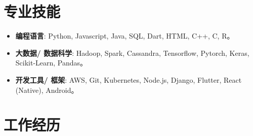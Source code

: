 \documentclass[11pt,a4paper,sans]{moderncv}        %
\begin{document}
\makecvtitle
\vspace{-3.5em}
\section{专业技能}

\vspace{2pt}

\begin{itemize}

\item{\textbf{编程语言}: Python, Javascript, Java, SQL, Dart, HTML, C++, C, R。}
\vspace{2pt}
\item{\textbf{大数据/ 数据科学}: Hadoop, Spark, Cassandra, Tensorflow, Pytorch, Keras, Scikit-Learn, Pandas。}
\vspace{2pt}
\item{\textbf{开发工具/ 框架}: AWS, Git, Kubernetes, Node.js, Django, Flutter, React (Native), Android。}
\end{itemize}

\section{工作经历	}
\end{document}
